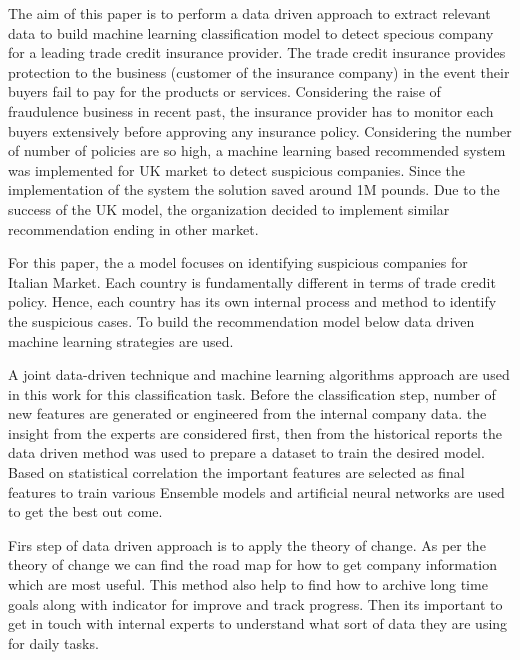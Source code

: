 

The aim of this paper is to perform a data driven approach to extract relevant data to build machine learning classification model to detect specious company for a leading trade credit insurance provider. The trade credit insurance provides protection to the business (customer of the insurance company) in the event their buyers fail to pay for the products or services. Considering the raise of fraudulence business in recent past, the insurance provider has to monitor each buyers extensively before approving any insurance policy. Considering the number of number of policies are so high, a machine learning based recommended system was implemented for UK market to detect suspicious companies. Since the implementation of the system the solution saved around 1M pounds. Due to the success of the UK model, the organization decided to implement similar recommendation ending in other market.

For this paper, the a model focuses on identifying suspicious companies for Italian Market. Each country is fundamentally different in terms of trade credit policy. Hence, each country has its own internal process and method to identify the suspicious cases. To build the recommendation model below data driven machine learning strategies are used.


A joint data-driven technique and machine learning algorithms approach are used in this work for this classification task. Before the classification step, number of new features are generated or engineered from the internal company data. the insight from the experts are considered first, then from the historical reports the data driven method was used to prepare a dataset to train the desired model. Based on statistical correlation the important features are selected as final features to train various Ensemble models and artificial neural networks are used to get the best out come.

Firs step of data driven approach is to apply the theory of change. As per the theory of change we can find the road map for how to get company information which are most useful. This method also help to find how to archive long time goals along with indicator for improve and track progress. Then its important to get in touch with internal experts to understand what sort of data they are using for daily tasks.

